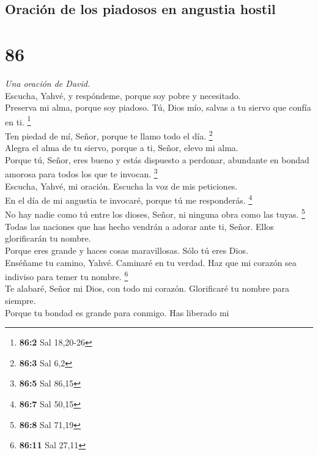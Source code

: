 \hypertarget{oraciuxf3n-de-los-piadosos-en-angustia-hostil}{%
\subsection{Oración de los piadosos en angustia
hostil}\label{oraciuxf3n-de-los-piadosos-en-angustia-hostil}}

\hypertarget{section-83}{%
\section{86}\label{section-83}}

\emph{Una oración de David.}\\
 Escucha, Yahvé, y respóndeme, porque soy pobre y
necesitado.\\
 Preserva mi alma, porque soy piadoso. Tú, Dios mío,
salvas a tu siervo que confía en ti. \footnote{\textbf{86:2} Sal
  18,20-26}\\
 Ten piedad de mí, Señor, porque te llamo todo el día.
\footnote{\textbf{86:3} Sal 6,2}\\
 Alegra el alma de tu siervo, porque a ti, Señor, elevo mi
alma.\\
 Porque tú, Señor, eres bueno y estás dispuesto a
perdonar, abundante en bondad amorosa para todos los que te invocan.
\footnote{\textbf{86:5} Sal 86,15}\\
 Escucha, Yahvé, mi oración. Escucha la voz de mis
peticiones.\\
 En el día de mi angustia te invocaré, porque tú me
responderás. \footnote{\textbf{86:7} Sal 50,15}\\
 No hay nadie como tú entre los dioses, Señor, ni ninguna
obra como las tuyas. \footnote{\textbf{86:8} Sal 71,19}\\
 Todas las naciones que has hecho vendrán a adorar ante
ti, Señor. Ellos glorificarán tu nombre.\\
 Porque eres grande y haces cosas maravillosas. Sólo tú
eres Dios.\\
 Enséñame tu camino, Yahvé. Caminaré en tu verdad. Haz
que mi corazón sea indiviso para temer tu nombre. \footnote{\textbf{86:11}
  Sal 27,11}\\
 Te alabaré, Señor mi Dios, con todo mi corazón.
Glorificaré tu nombre para siempre.\\
 Porque tu bondad es grande para conmigo. Has liberado mi
